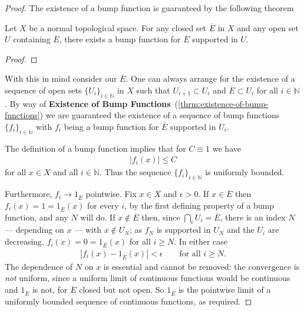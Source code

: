 \begin{proof}
The existence of a bump function is guaranteed by the following theorem

\begin{theorem}
    \label{thrm:existence-of-bump-functions}
    \leanok
    Let $X$ be a normal topological space. For any closed set $\overline{E}$ in $X$ and any open set $U$ containing $\overline{E}$, there exists a bump function for $\overline{E}$ supported in $U$.
\end{theorem}
\begin{proof}
\leanok
\end{proof}

With this in mind consider our $\overline{E}$. One can always arrange for the existence of a sequence of open sets $\{ U_i \}_{i \in \mathbb{N}}$ in $X$ such that $U_{i + 1} \subset U_{i}$ and $\overline{E} \subset U_i$ for all $i \in \mathbb{N}$. By way of \textbf{Existence of Bump Functions}~(\ref{thrm:existence-of-bump-functions}) we are guaranteed the existence of a sequence of bump functions $\{ f_i \}_{i \in \mathbb{N}}$ with $f_i$ being a bump function for $\overline{E}$ supported in $U_i$.

The definition of a bump function implies that for $C \equiv 1$ we have
\begin{align}
    \left\lvert f_i(x) \right\rvert \le C
\end{align}
for all $x \in X$ and all $i \in \mathbb{N}$. Thus the sequence $\{ f_i \}_{i \in \mathbb{N}}$ is uniformly bounded.

Furthermore, $f_i \to 1_{\overline{E}}$ pointwise. Fix $x \in X$ and $\epsilon > 0$. If $x \in \overline{E}$ then $f_i(x) = 1 = 1_{\overline{E}}(x)$ for every $i$, by the first defining property of a bump function, and any $N$ will do. If $x \notin \overline{E}$ then, since $\bigcap_i U_i = \overline{E}$, there is an index $N$ — depending on $x$ — with $x \notin U_N$; as $f_N$ is supported in $U_N$ and the $U_i$ are decreasing, $f_i(x) = 0 = 1_{\overline{E}}(x)$ for all $i \ge N$. In either case
\begin{align}
    \left\lvert f_i(x) - 1_{\overline{E}}(x) \right\rvert < \epsilon \qquad \text{for all } i \ge N.
\end{align}
The dependence of $N$ on $x$ is essential and cannot be removed: the convergence is \textit{not} uniform, since a uniform limit of continuous functions would be continuous and $1_{\overline{E}}$ is not, for $\overline{E}$ closed but not open. So $1_{\overline{E}}$ is the pointwise limit of a uniformly bounded sequence of continuous functions, as required.
\end{proof}

